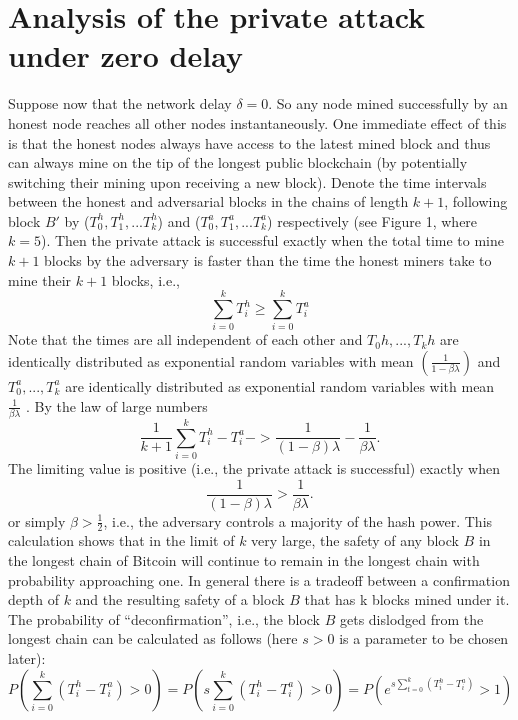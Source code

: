 \documentclass{report}
\begin{document}
\section{Analysis of the private attack under zero delay}
Suppose now that the network delay $\delta = 0$. So any node mined successfully by an honest node reaches all other nodes instantaneously. One immediate eﬀect of this is that the honest nodes always have access to the latest mined block and thus can always mine on the tip of the longest public blockchain (by potentially switching their mining upon receiving a new block). Denote the time intervals between the honest and adversarial blocks in the chains of length $k + 1$, following block $B′$ by ($T_{0}^{h}, T_{1}^{h}, . . . T_{k}^{h}$) and ($T_{0}^{a}, T_{1}^{a}, . . . T_{k}^{a}$) respectively (see Figure 1, where $k = 5$). Then the private attack is successful exactly when the total time to mine $k + 1$ blocks by the adversary is faster than the time the honest miners take to mine their $k + 1$ blocks, i.e.,
\begin{equation*}
	\sum_{i=0}^{k} T_{i}^{h} \geq \sum_{i=0}^{k} T_{i}^{a}
\end{equation*}
Note that the times are all independent of each other and $T_{0}{h}, . . . , T_{k}{h}$ are identically distributed as exponential random variables with mean $(\frac{1}{1 - \beta\lambda})$ and $T_{0}^{a}, . . . , T_{k}^{a}$ are identically distributed as exponential random variables with mean $\frac{1}{\beta\lambda}$ . By the law of large numbers
\begin{equation*}
	\frac{1}{k + 1}\sum_{i=0}^{k} T_{i}^{h} - T_{i}^{a}   -> \frac{1}{(1 - \beta) \lambda} - \frac{1}{\beta\lambda}.
\end{equation*}
The limiting value is positive (i.e., the private attack is successful) exactly when
\begin{equation*}
	\frac{1}{(1 - \beta) \lambda} > \frac{1}{\beta\lambda}.
\end{equation*}
or simply $\beta > \frac{1}{2}$, i.e., the adversary controls a majority of the hash power. This calculation shows that in the limit of $k$ very large, the safety of any block $B$ in the longest chain of Bitcoin will continue to remain in the longest chain with probability approaching one. In general there is a tradeoﬀ between a confirmation depth of $k$ and the resulting safety of a block $B$ that has k blocks mined under it. The probability of “deconfirmation”, i.e., the block $B$ gets dislodged from the longest chain can be calculated as follows (here $s > 0$ is a parameter to be chosen later):
\begin{equation}
	P(\sum_{i=0}^{k}(T_{i}^{h} - T_{i}^{a}) > 0) = P(s\sum_{i=0}^{k}(T_{i}^{h} - T_{i}^{a}) > 0) = P(e^{s\sum_{t=0}^{k}(T_{i}^{h} - T_{i}^{a})} > 1)	
\end{equation}
\end{document}
